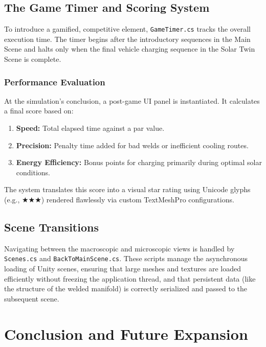 \documentclass[12pt,a4paper,oneside]{report}
\begin{document}
\section{The Game Timer and Scoring System}
To introduce a gamified, competitive element, \texttt{GameTimer.cs} tracks the overall execution time. 
The timer begins after the introductory sequences in the Main Scene and halts only when the final vehicle charging sequence in the Solar Twin Scene is complete.

\subsection{Performance Evaluation}
At the simulation's conclusion, a post-game UI panel is instantiated. It calculates a final score based on:
\begin{enumerate}
    \item \textbf{Speed:} Total elapsed time against a par value.
    \item \textbf{Precision:} Penalty time added for bad welds or inefficient cooling routes.
    \item \textbf{Energy Efficiency:} Bonus points for charging primarily during optimal solar conditions.
\end{enumerate}
The system translates this score into a visual star rating using Unicode glyphs (e.g., $\bigstar \bigstar \bigstar$) rendered flawlessly via custom TextMeshPro configurations.

\section{Scene Transitions}
Navigating between the macroscopic and microscopic views is handled by \texttt{Scenes.cs} and \texttt{BackToMainScene.cs}. These scripts manage the asynchronous loading of Unity scenes, ensuring that large meshes and textures are loaded efficiently without freezing the application thread, and that persistent data (like the structure of the welded manifold) is correctly serialized and passed to the subsequent scene.

\chapter{Conclusion and Future Expansion}
\end{document}

